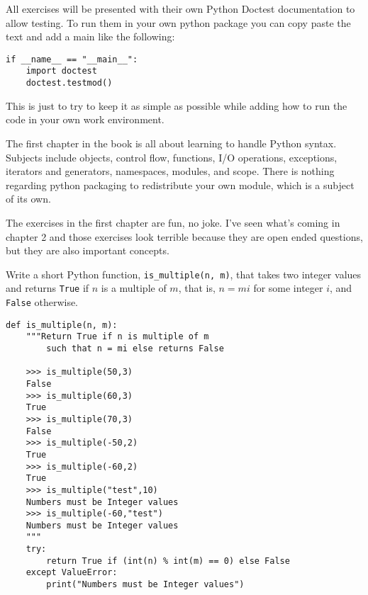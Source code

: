 
All exercises will be presented with their own Python Doctest documentation to allow testing. To run them in your own python package you can copy paste the text and add a main like the following:

\begin{lstlisting}[title=Running Doctest]
if __name__ == "__main__":
    import doctest
    doctest.testmod()
\end{lstlisting}

This is just to try to keep it as simple as possible while adding how to run the code in your own work environment.






The first chapter in the book is all about learning to handle Python syntax. Subjects include objects, control flow, functions, I/O operations, exceptions, iterators and generators, namespaces, modules, and scope. There is nothing regarding python packaging to redistribute your own module, which is a subject of its own. 

\label{ssec:Exercises}

The exercises in the first chapter are fun, no joke. I've seen what's coming in chapter 2 and those exercises look terrible because they are open ended questions, but they are also important concepts.  

 \label{sssec:ex1_1}

Write a short Python function, \texttt{is\_multiple(n, m)}, that takes two integer values and returns \texttt{True} if $n$ is a multiple of $m$, that is, $n = mi$ for some integer $i$, and \texttt{False} otherwise.

\begin{lstlisting}[title=Exercise R-1.1]
def is_multiple(n, m):
    """Return True if n is multiple of m 
		such that n = mi else returns False

    >>> is_multiple(50,3)
    False
    >>> is_multiple(60,3)
    True
    >>> is_multiple(70,3)
    False
    >>> is_multiple(-50,2)
    True
    >>> is_multiple(-60,2)
    True
    >>> is_multiple("test",10)
    Numbers must be Integer values
    >>> is_multiple(-60,"test")
    Numbers must be Integer values
    """
    try:
        return True if (int(n) % int(m) == 0) else False
    except ValueError:
        print("Numbers must be Integer values")
\end{lstlisting}

